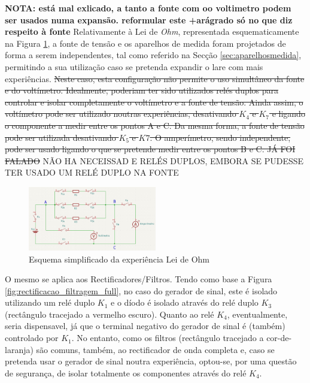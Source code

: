 \textbf{NOTA: está mal exlicado, a tanto a fonte com oo voltimetro podem ser usados numa expansão. reformular este +arágrado só no que diz respeito à fonte}
Relativamente à Lei de \textit{Ohm}, representada esquematicamente na Figura \ref{fig:esq_geral_ohm}, a fonte de tensão e os aparelhos de medida foram projetados de forma a serem independentes, tal como referido na Secção \ref{sec:aparelhosmedida}, permitindo a sua utilização caso se pretenda expandir o \acrshort{lare} com mais experiências. \sout{Neste caso, esta configuração não permite o uso simultâneo da fonte e do voltímetro. Idealmente, poderiam ter sido utilizados relés duplos para controlar e isolar completamente o voltímetro e a fonte de tensão. Ainda assim, o voltímetro pode ser utilizado noutras experiências, desativando $K_{4}$ e $K_{7}$ e ligando o componente a medir entre os pontos A e C. Da mesma forma, a fonte de tensão pode ser utilizada desativando $K_{5}$ e $K7$. O amperímetro, sendo independente, pode ser usado ligando o que se pretende medir entre os pontos B e C. JÁ FOI FALADO } NÃO HA NECEISSAD E RELÉS DUPLOS, EMBORA SE PUDESSE TER USADO UM RELÉ DUPLO NA FONTE

\begin{figure}[hbtp]
	\centering
	\includegraphics[width=0.5\textwidth]{figures/esquema_simplificado_OHM.png}
	\caption{Esquema simplificado da experiência Lei de Ohm}
	\label{fig:esq_geral_ohm}
\end{figure}

O mesmo se aplica aos Rectificadores/Filtros. Tendo como base a Figura \ref{fig:rectificacao_filtragem_full}, no caso do gerador de sinal, este é isolado utilizando um relé duplo $K_{1}$ e o díodo é isolado através do relé duplo $K_{3}$ (rectângulo tracejado a vermelho escuro). Quanto ao relé $K_{4}$, eventualmente, seria dispensavel, já que o terminal negativo do gerador de sinal é (também) controlado por $K_{1}$. No entanto, como os filtros (rectângulo tracejado a cor-de-laranja) são comuns,  também, ao rectificador de onda completa e, caso se pretenda usar o gerador de sinal noutra experiência, optou-se, por uma questão de segurança, de isolar totalmente os componentes através do relé $K_{4}$.

